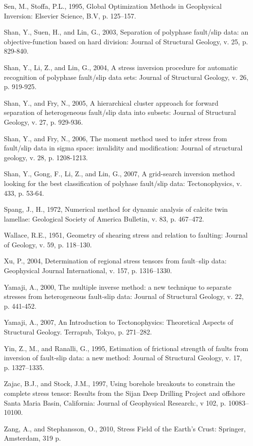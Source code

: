 {\begin{hangparas}{.25in}{1}
    Sen, M., Stoffa, P.L., 1995, Global Optimization Methods in Geophysical Inversion: Elsevier Science, B.V, p. 125–157.
    
    Shan, Y., Suen, H., and Lin, G., 2003, Separation of polyphase fault/slip data: an objective-function based on hard division: Journal of Structural Geology, v. 25, p. 829-840.

    Shan, Y., Li, Z., and Lin, G., 2004, A stress inversion procedure for automatic recognition of polyphase fault/slip data sets: Journal of Structural Geology, v. 26, p. 919-925. 

    Shan, Y., and Fry, N., 2005, A hierarchical cluster approach for forward separation of heterogeneous fault/slip data into subsets: Journal of Structural Geology, v. 27, p. 929-936. 

    Shan, Y., and Fry, N., 2006, The moment method used to infer stress from fault/slip data in sigma space: invalidity and modification: Journal of structural geology, v. 28, p. 1208-1213.  

    Shan, Y., Gong, F., Li, Z., and Lin, G., 2007, A grid-search inversion method looking for the best classification of polyhase fault/slip data: Tectonophysics, v. 433, p. 53-64. 

    Spang, J., H., 1972, Numerical method for dynamic analysis of calcite twin lamellae: Geological Society of America Bulletin, v. 83, p. 467–472.

    Wallace, R.E., 1951, Geometry of shearing stress and relation to faulting: Journal of Geology, v. 59, p. 118–130.
    
    Xu, P., 2004, Determination of regional stress tensors from fault–slip data: Geophysical Journal International, v. 157, p. 1316–1330.
    
    Yamaji, A., 2000, The multiple inverse method: a new technique to separate stresses from heterogeneous fault-slip data: Journal of Structural Geology, v. 22, p. 441-452.
    
    Yamaji, A., 2007, An Introduction to Tectonophysics: Theoretical Aspects of Structural Geology. Terrapub, Tokyo, p. 271–282.

    Yin, Z., M., and Ranalli, G., 1995, Estimation of frictional strength of faults from inversion of fault-slip data: a new method: Journal of Structural Geology, v. 17, p. 1327–1335.

    Zajac, B.J., and Stock, J.M., 1997, Using borehole breakouts to constrain the complete stress tensor: Results from the Sijan Deep Drilling Project and offshore Santa Maria Basin, California: Journal of Geophysical Research:, v 102, p. 10083–10100.

    Zang, A., and Stephansson, O., 2010, Stress Field of the Earth’s Crust: Springer, Amsterdam, 319 p.

\end{hangparas}
}